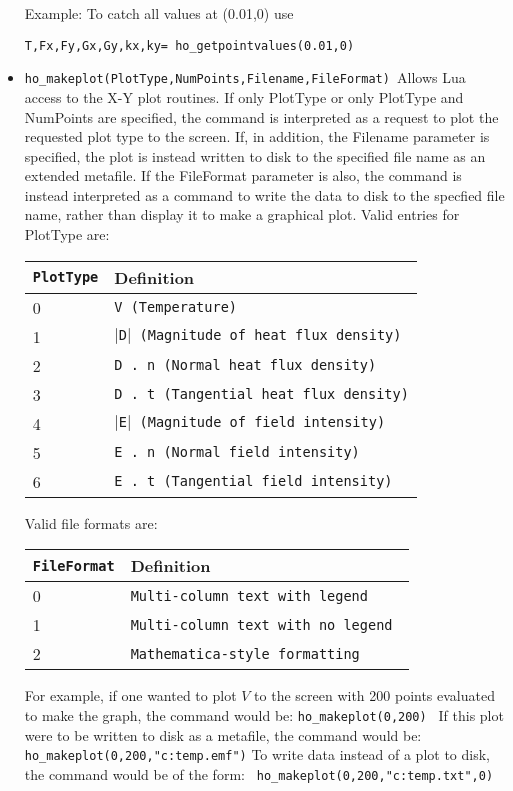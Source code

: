 \begin{itemize}
Example: To catch all values at (0.01,0) use

\texttt{T,Fx,Fy,Gx,Gy,kx,ky= ho\_getpointvalues(0.01,0) }

\item \texttt{ho\_makeplot(PlotType,NumPoints,Filename,FileFormat) }Allows Lua access
to the X-Y plot routines. If only PlotType or only PlotType and NumPoints
are specified, the command is interpreted as a request to plot the requested
plot type to the screen. If, in addition, the Filename parameter is
specified, the plot is instead written to disk to the specified file name as
an extended metafile. If the FileFormat parameter is also, the command is
instead interpreted as a command to write the data to disk to the specfied
file name, rather than display it to make a graphical plot. Valid entries
for PlotType are:

\begin{tabular}{ll}
\texttt{PlotType} &  Definition \\ \hline
 0 & \texttt{V (Temperature)} \\
 1 & \texttt{$\vert$D$\vert$ (Magnitude of heat flux density)} \\
 2 & \texttt{D . n (Normal heat flux density)} \\
 3 & \texttt{D . t (Tangential heat flux density)} \\
 4 & \texttt{$\vert$E$\vert$ (Magnitude of field intensity)} \\
 5 & \texttt{E . n (Normal field intensity)} \\
 6 & \texttt{E . t (Tangential field intensity)}
\end{tabular}

\vspace*{8pt}
Valid file formats are:

\begin{tabular}{ll}
\texttt{FileFormat} &  Definition  \\ \hline
 0 & \texttt{Multi-column text with legend } \\
 1 & \texttt{Multi-column text with no legend } \\
 2 & \texttt{Mathematica-style formatting}
\end{tabular}

For example, if one wanted to plot $V $ to the screen with 200 points evaluated
to make the graph, the command would be: \newline
\texttt{ho\_makeplot(0,200) } \newline
If this plot were to be written to disk as a metafile, the command
would be:\texttt{ } \newline
\texttt{ho\_makeplot(0,200,"c:temp.emf")} \newline
To write data instead of a plot to disk, the command would be of
the form:\texttt{ } \newline
\texttt{ho\_makeplot(0,200,"c:temp.txt",0)} \newline



\end{itemize}
